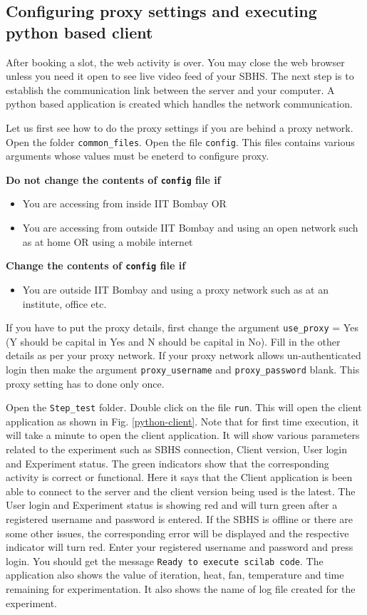 \subsection{Configuring proxy settings and executing python based client}\label{proxy}
After booking a slot, the web activity is over. You may close the web browser unless you need it open to see live video feed of your SBHS. The next step is to establish the communication link between the server and your computer. A python based application is created which handles the network communication. 

Let us first see how to do the proxy  settings if you are behind a proxy network. Open the folder {\tt common\_files}. Open the file {\tt config}. This files contains various arguments whose values must be eneterd to configure proxy. 

{\bf Do not change the contents of {\tt config} file if}
\begin{itemize}
\item You are accessing from inside IIT Bombay OR
\item You are accessing from outside IIT Bombay and using an open network such as at home OR using a mobile internet
\end{itemize}

{\bf Change the contents of {\tt config}  file if}
\begin{itemize}
\item You are outside IIT Bombay and using a proxy network such as at an institute, office etc.
\end{itemize}

If you have to put the proxy details, first change the argument {\tt use\_proxy} = Yes (Y should be capital in Yes and N should be capital in No). Fill in the other details as per your proxy network. If your proxy network allows un-authenticated login then make the argument {\tt proxy\_username} and {\tt proxy\_password}  blank. This proxy setting has to done only once.

Open the {\tt Step\_test} folder. Double click on the file {\tt run}. This will open the client application as shown in Fig. \ref{python-client}. Note that for first time execution, it will take a minute to open the client application. It will show various parameters related to the experiment such as SBHS connection, Client version, User login and Experiment status. The green indicators show that the corresponding activity is correct or functional. Here it says that the Client application is been able to connect to the server and the client version being used is the latest. The User login and Experiment status is showing red and will turn green after a registered username and password is entered. If the SBHS is offline or there are some other issues, the corresponding error will be displayed and the respective indicator will turn red. Enter your registered username and password and press login. You should get the message {\tt Ready to execute scilab code}. The application also shows the value of iteration, heat, fan, temperature and time remaining for experimentation. It also shows the name of log file created for the experiment.

